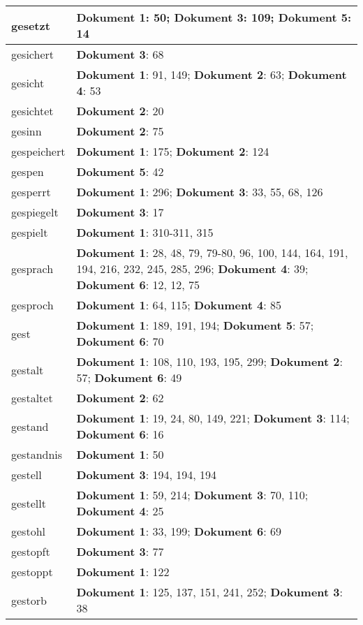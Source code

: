 \documentclass[a5paper]{article}
\begin{document}
\begin{longtable}[l]{|l|p{3in}|}
\hline
gesetzt & \textbf{Dokument 1}: 50; \textbf{Dokument 3}: 109; \textbf{Dokument 5}: 14 \\
\hline
gesichert & \textbf{Dokument 3}: 68 \\
\hline
gesicht & \textbf{Dokument 1}: 91, 149; \textbf{Dokument 2}: 63; \textbf{Dokument 4}: 53 \\
\hline
gesichtet & \textbf{Dokument 2}: 20 \\
\hline
gesinn & \textbf{Dokument 2}: 75 \\
\hline
gespeichert & \textbf{Dokument 1}: 175; \textbf{Dokument 2}: 124 \\
\hline
gespen & \textbf{Dokument 5}: 42 \\
\hline
gesperrt & \textbf{Dokument 1}: 296; \textbf{Dokument 3}: 33, 55, 68, 126 \\
\hline
gespiegelt & \textbf{Dokument 3}: 17 \\
\hline
gespielt & \textbf{Dokument 1}: 310-311, 315 \\
\hline
gesprach & \textbf{Dokument 1}: 28, 48, 79, 79-80, 96, 100, 144, 164, 191, 194, 216, 232, 245, 285, 296; \textbf{Dokument 4}: 39; \textbf{Dokument 6}: 12, 12, 75 \\
\hline
gesproch & \textbf{Dokument 1}: 64, 115; \textbf{Dokument 4}: 85 \\
\hline
gest & \textbf{Dokument 1}: 189, 191, 194; \textbf{Dokument 5}: 57; \textbf{Dokument 6}: 70 \\
\hline
gestalt & \textbf{Dokument 1}: 108, 110, 193, 195, 299; \textbf{Dokument 2}: 57; \textbf{Dokument 6}: 49 \\
\hline
gestaltet & \textbf{Dokument 2}: 62 \\
\hline
gestand & \textbf{Dokument 1}: 19, 24, 80, 149, 221; \textbf{Dokument 3}: 114; \textbf{Dokument 6}: 16 \\
\hline
gestandnis & \textbf{Dokument 1}: 50 \\
\hline
gestell & \textbf{Dokument 3}: 194, 194, 194 \\
\hline
gestellt & \textbf{Dokument 1}: 59, 214; \textbf{Dokument 3}: 70, 110; \textbf{Dokument 4}: 25 \\
\hline
gestohl & \textbf{Dokument 1}: 33, 199; \textbf{Dokument 6}: 69 \\
\hline
gestopft & \textbf{Dokument 3}: 77 \\
\hline
gestoppt & \textbf{Dokument 1}: 122 \\
\hline
gestorb & \textbf{Dokument 1}: 125, 137, 151, 241, 252; \textbf{Dokument 3}: 38 \\

\end{longtable}
\end{document}
